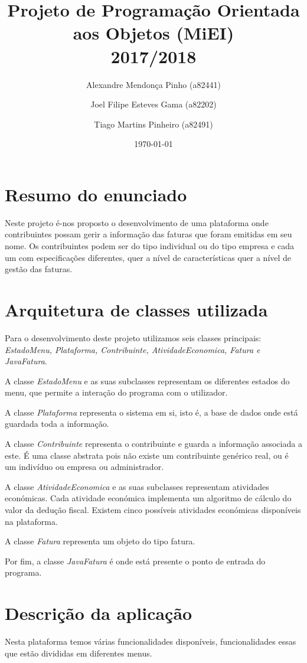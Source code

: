 \documentclass[12pt]{report}
\title{Projeto de Programação Orientada aos Objetos (MiEI) \\ 2017/2018}
\author{Alexandre Mendonça Pinho (a82441) \and Joel Filipe Esteves Gama (a82202) \and Tiago Martins Pinheiro (a82491)}
\date{\today}
\newcommand\tab[1][0.5cm]{\hspace*{#1}}
\begin{document}
\maketitle

\tableofcontents

\chapter{Resumo do enunciado}
\label{sec:resumo}

\tab Neste projeto é-nos proposto o desenvolvimento de uma plataforma onde contribuintes possam gerir a informação das faturas que foram emitidas em seu nome. Os contribuintes podem ser do tipo individual ou do tipo empresa e cada um com especificações diferentes, quer a nível de características quer a nível de gestão das faturas.

\chapter{Arquitetura de classes utilizada}
\label{sec:arquitetura}
\tab Para o desenvolvimento deste projeto utilizamos seis classes principais: \textit{EstadoMenu, Plataforma, Contribuinte, AtividadeEconomica, Fatura e JavaFatura}.

A classe \textit{EstadoMenu} e as suas subclasses representam os diferentes estados do menu, que permite a interação do programa com o utilizador.

A classe \textit{Plataforma} representa o sistema em si, isto é, a base de dados onde está guardada toda a informação.

A classe \textit{Contribuinte} representa o contribuinte e guarda a informação associada a este. É uma classe abstrata pois não existe um contribuinte genérico real, ou é um indivíduo ou empresa ou administrador.

A classe \textit{AtividadeEconomica} e as suas subclasses representam atividades económicas. Cada atividade económica implementa um algoritmo de cálculo do valor da dedução fiscal. Existem cinco possíveis atividades económicas disponíveis na plataforma.

A classe \textit{Fatura} representa um objeto do tipo fatura.

Por fim, a classe \textit{JavaFatura} é onde está presente o ponto de entrada do programa.

\chapter{Descrição da aplicação}
\label{sec:descricao}
\tab Nesta plataforma temos várias funcionalidades disponíveis, funcionalidades essas que estão divididas em diferentes menus.
\end{document}
